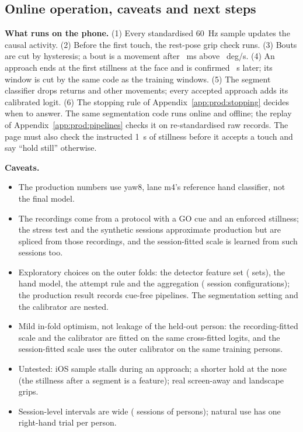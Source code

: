 \subsection{Online operation, caveats and next steps}\label{app:prod:caveats}

\textbf{What runs on the phone.}
(1) Every standardised 60~Hz sample updates the causal activity.
(2) Before the first touch, the rest-pose grip check runs.
(3) Bouts are cut by hysteresis; a bout is a movement after ~ms above ~deg/s.
(4) An approach ends at the first stillness at the face and is confirmed ~s later; its window is cut by the same code as the training windows.
(5) The segment classifier drops returns and other movements; every accepted approach adds its calibrated logit.
(6) The stopping rule of Appendix~\ref{app:prod:stopping} decides when to answer.
The same segmentation code runs online and offline; the replay of Appendix~\ref{app:prod:pipelines} checks it on re-standardised raw records.
The page must also check the instructed 1~s of stillness before it accepts a touch and say ``hold still'' otherwise.

\textbf{Caveats.}
\begin{itemize}[nosep]
  \item The production numbers use yaw8, lane m4's reference hand classifier, not the final model.
  \item The recordings come from a protocol with a GO cue and an enforced stillness; the stress test and the synthetic sessions approximate production but are spliced from those recordings, and the session-fitted scale is learned from such sessions too.
  \item Exploratory choices on the outer folds: the detector feature set ( sets), the hand model, the attempt rule and the aggregation ( session configurations); the production result records  cue-free pipelines. The segmentation setting and the calibrator are nested.
  \item Mild in-fold optimism, not leakage of the held-out person: the recording-fitted scale and the calibrator are fitted on the same cross-fitted logits, and the session-fitted scale uses the outer calibrator on the same training persons.
  \item Untested: iOS sample stalls during an approach; a shorter hold at the nose (the stillness after a segment is a feature); real screen-away and landscape grips.
  \item Session-level intervals are wide ( sessions of  persons); natural use has one right-hand trial per person.
\end{itemize}

